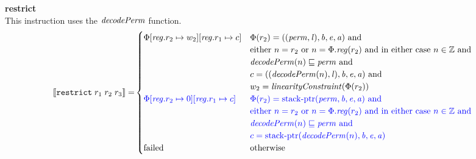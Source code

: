 \documentclass[a4paper]{article}
\newcommand{\sem}[1]{\left\llbracket #1 \right\rrbracket}
\newcommand{\tand}{\text{ and }}
\newcommand{\totherwise}{\text{otherwise }}
\newcommand{\sourcecolor}[1]{\color{blue}}
\newcommand{\src}[1]{{\sourcecolor{} #1}}
\newcommand{\targetcolor}[1]{\color{black}}
\newcommand{\trg}[1]{{\targetcolor{} #1}}
\newcommand{\zinstr}[1]{\texttt{#1}}
\newcommand{\threeinstr}[4]{
  \ifthenelse{\equal{#2#3#4}{}}
  {\zinstr{#1}}
  {\zinstr{#1} \; #2 \; #3 \; #4}
}
\newcommand{\trestrict}[3]{\threeinstr{\trg{restrict}}{#1}{#2}{#3}}
\newcommand{\ints}{\mathbb{Z}}
\newcommand{\update}[2]{[#1 \mapsto #2]}
\newcommand{\updReg}[2]{\update{\reg.#1}{#2}}
\newcommand{\perm}{\var{perm}}
\newcommand{\lin}{\var{l}}
\newcommand{\stkptr}[1]{\mathrm{stack\text{-}ptr}(#1)}
\newcommand{\failed}{\mathrm{failed}}
\newcommand{\var}[1]{\mathit{#1}}
\newcommand{\reg}{\var{reg}}
\newcommand{\baddr}{\var{b}}
\newcommand{\eaddr}{\var{e}}
\newcommand{\aaddr}{\var{a}}
\newcommand{\plainfun}[2]{
  \ifthenelse{\equal{#2}{}}
  {\mathit{#1}}
  {\mathit{#1}(#2)}
}
\newcommand{\decPerm}[1]{\plainfun{decodePerm}{#1}}
\newcommand{\linCons}[1]{\plainfun{linearityConstraint}{#1}}
\begin{document}
\noindent\textbf{restrict}\\
This instruction uses the $\decPerm{}$ function.
\begin{align*}
  \sem{\trestrict{r_1}{r_2}{r_3}} = &
                                      \begin{cases}
                                        \Phi\updReg{r_2}{w_2}\updReg{r_1}{c} &
                                        \arraycolsep=0pt
                                        \begin{array}[t]{l}
                                          \Phi(r_2) = ((\perm,\lin),\baddr,\eaddr,\aaddr) \tand \\
                                          \text{either $n = r_2$ or $n = \Phi.\reg(r_2)$ and in either case $n \in \ints$ and} \\
                                          \decPerm{n} \sqsubseteq \perm \tand \\
                                          c = ((\decPerm{n},\lin),\baddr,\eaddr,\aaddr) \tand \\
                                          w_2 = \linCons{\Phi(r_2)}
                                        \end{array}
                                        \\
                                        \src{\Phi\updReg{r_2}{0}\updReg{r_1}{c}} &
                                        \arraycolsep=0pt
                                        \begin{array}[t]{l}
                                          \src{\Phi(r_2) = \stkptr{\perm,\baddr,\eaddr,\aaddr} \tand} \\
                                          \src{\text{either $n = r_2$ or $n = \Phi.\reg(r_2)$ and in either case $n \in \ints$ and}} \\
                                          \src{\decPerm{n} \sqsubseteq \perm \tand} \\
                                          \src{c = \stkptr{\decPerm{n},\baddr,\eaddr,\aaddr}}
                                        \end{array}
                                        \\
                                        \failed & \totherwise
                                      \end{cases}
\end{align*}
\end{document}
